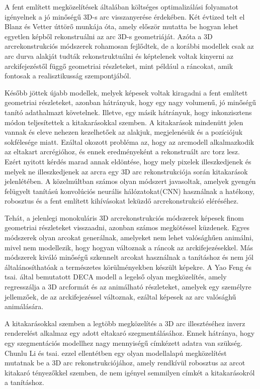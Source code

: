 \documentclass[12pt,a4]{article}
\begin{document}
        A fent említett megközelítések általában költséges optimalizálási folyamatot igényelnek a jó minőségű 3D-s arc visszanyerése érdekében. Két évtized telt el \cite{blanzvetter}Blanz és Vetter úttörő munkája óta, amely először mutatta be hogyan lehet egyetlen képből rekonstruálni az arc 3D-s geometriáját. Azóta a 3D arcrekonstrukciós módszerek rohamosan fejlődtek, de a korábbi modellek csak az arc durva alakját tudták rekonstruktuálni és képtelenek voltak kinyerni az arckifejezéstől függő geometriai részleteket, mint például a ráncokat, amik fontosak a realisztikusság szempontjából.

        Később jöttek újabb modellek, melyek képesek voltak kiragadni a fent említett geometriai részleteket, azonban hátrányuk, hogy egy nagy volumenű, jó minőségű tanító adathalmazt követelnek. Illetve, egy másik hátrányuk, hogy inkonzisztens módon teljesítettek a kitakarásokkal szemben. A kitakarások mindenütt jelen vannak és eleve nehezen kezelhetőek az alakjuk, megjelenésük és a pozíciójuk sokfélesége miatt. Ezáltal okozott probléma az, hogy az arcmodell alkalmazkodik az eltakart arcrégióhoz, és ennek eredményeként a rekonstruált arc torz lesz. Ezért nyitott kérdés marad annak eldöntése, hogy mely pixelek illeszkedjenek és melyek ne illeszkedjenek az arcra egy 3D arc rekonstrukciója során kitakarások jelenlétében. A közelmúltban számos olyan módszert javasoltak, amelyek gyengén felügyelt tanítású konvolúciós neurális hálózatokat(CNN) használnak a hatékony, robosztus és a fent említett kihívásokat leküzdő arcrekonstrukció eléréséhez.

        Tehát, a jelenlegi monokuláris 3D arcrekonstrukciós módszerek képesek finom geometriai részleteket visszaadni, azonban számos megkötéssel küzdenek. Egyes módszerek olyan arcokat generálnak, amelyeket nem lehet valósághűen animálni, mivel nem modellezik, hogy hogyan változnak a ráncok az arckifejezésekkel. Más módszerek kiváló minőségű szkennelt arcokat használnak a tanításhoz és nem jól általánosíthatóak a természetes körülményekben készült képekre. A \cite{deca}Yao Feng és tsai. által bemutatott DECA modell a legelső olyan megközelítés, amely regresszálja a 3D arcformát és az animálható részleteket, amelyek egy személyre jellemzőek, de az arckifejezéssel változnak, ezáltal képesek az arc valósághű animálására.

        A kitakarásokkal szemben a legtöbb megközelítés a 3D arc illesztéséhez inverz renderelést alkalmaz egy adott eltakaró szegmentálásához. Ennek hátránya, hogy egy szegmentációs modellhez nagy mennyiségű címkézett adatra van szükség. Chunlu Li és tsai. \cite{focus} ezzel ellentétben egy olyan modellalapú megközelítést mutatnak be a 3D arc rekonstrukciójához, amely rendkívül robosztus az arcot kitakaró tényezőkkel szemben, de nem igényel semmilyen címkét a kitakarásokról a tanításhoz.
\end{document}
